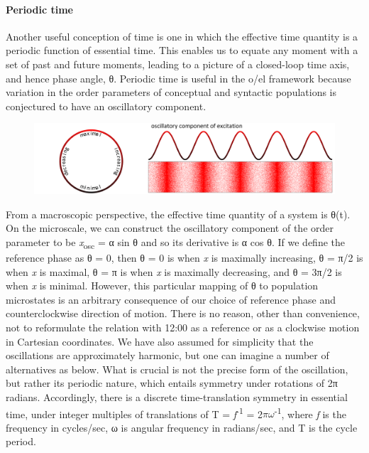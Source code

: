 \paragraph{Periodic time}

Another useful conception of time is one in which the effective time quantity is a periodic function of  essential time. This enables us to equate any moment with a set of past and future moments, leading to a picture of a closed-loop time axis, and hence phase angle, θ. Periodic time is useful in the o/el framework because variation in the order parameters of conceptual and syntactic populations is conjectured to have an oscillatory component.

  
\begin{figure}
\includegraphics[width=\textwidth]{figures/Tilsen-img46.png}
\caption{\missingcaption}
\label{fig:}
\end{figure}
 

  From a macroscopic perspective, the effective time quantity of a system is θ(t). On the microscale, we can construct the oscillatory component of the order parameter to be \textit{x}\textsubscript{osc} = α sin θ and so its derivative is α cos θ. If we define the reference phase as θ = 0, then θ = 0 is when \textit{x} is maximally increasing, θ = π/2 is when \textit{x} is maximal, θ = π is when \textit{x} is maximally decreasing, and θ = 3π/2 is when \textit{x} is minimal. However, this particular mapping of θ to population microstates is an arbitrary consequence of our choice of reference phase and counterclockwise direction of motion. There is no reason, other than convenience, not to reformulate the relation with 12:00 as a reference or as a clockwise motion in Cartesian coordinates. We have also assumed for simplicity that the oscillations are approximately harmonic, but one can imagine a number of alternatives as below. What is crucial is not the precise form of the oscillation, but rather its periodic nature, which entails symmetry under rotations of 2π radians. Accordingly, there is a discrete time-translation symmetry in essential time, under integer multiples of translations of T = \textit{f}\textsuperscript{{}-1} = 2$\pi \omega $\textsuperscript{{}-1}, where \textit{f} is the frequency in cycles/sec, ω is angular frequency in radians/sec, and T is the cycle period.

